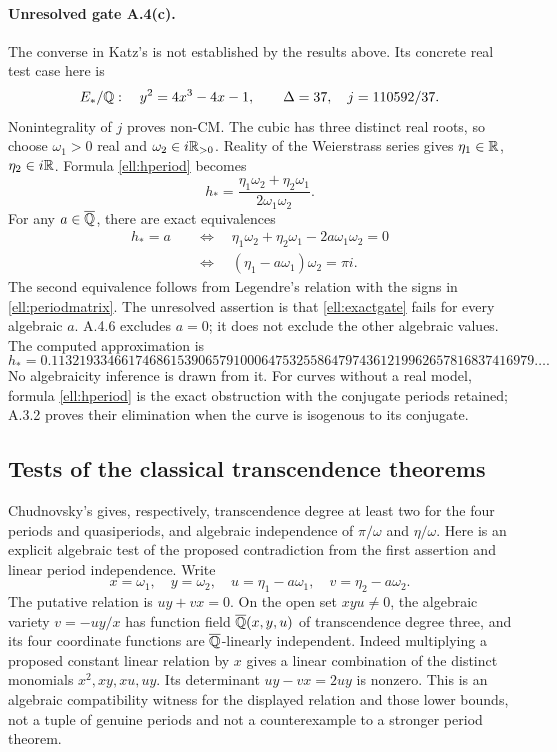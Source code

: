 \paragraph{Unresolved gate A.4(c).}
The converse in Katz's \cite[Question 4.0.8, p.501]{EllKatz1976} is not established by the results above. Its concrete real test case here is
\[
 E_* /\mathbb Q:\quad y^2=4x^3-4x-1,
 \qquad \Delta=37,\quad j=110592/37.
\]
Nonintegrality of $j$ proves non-CM. The cubic has three distinct real roots, so choose $\omega_1>0$ real and $\omega_2\in i\mathbb R_{>0}$. Reality of the Weierstrass series gives $\eta_1\in\mathbb R$, $\eta_2\in i\mathbb R$. Formula \eqref{ell:hperiod} becomes
\[
 h_* =\frac{\eta_1\omega_2+\eta_2\omega_1}{2\omega_1\omega_2}.
\]
For any $a\in\overline{\mathbb Q}$, there are exact equivalences
\begin{equation}\label{ell:exactgate}
 \begin{split}
 h_*=a
 &\quad\Longleftrightarrow\quad
 \eta_1\omega_2+\eta_2\omega_1-2a\omega_1\omega_2=0\\
 &\quad\Longleftrightarrow\quad (\eta_1-a\omega_1)\omega_2=\pi i.
 \end{split}
\end{equation}
The second equivalence follows from Legendre's relation with the signs in \eqref{ell:periodmatrix}. The unresolved assertion is that \eqref{ell:exactgate} fails for every algebraic $a$. A.4.6 excludes $a=0$; it does not exclude the other algebraic values. The computed approximation is
\[
 h_*=0.113219334661746861539065791000647532558647974361219962657816837416979\ldots.
\]
No algebraicity inference is drawn from it. For curves without a real model, formula \eqref{ell:hperiod} is the exact obstruction with the conjugate periods retained; A.3.2 proves their elimination when the curve is isogenous to its conjugate.

\subsection{Tests of the classical transcendence theorems}

Chudnovsky's \cite[\S2A, Theorems 1 and 3, p.343]{EllChudnovsky1978} gives, respectively, transcendence degree at least two for the four periods and quasiperiods, and algebraic independence of $\pi/\omega$ and $\eta/\omega$. Here is an explicit algebraic test of the proposed contradiction from the first assertion and linear period independence. Write
\[
 x=\omega_1,\quad y=\omega_2,\quad
 u=\eta_1-a\omega_1,\quad v=\eta_2-a\omega_2.
\]
The putative relation is $uy+vx=0$. On the open set $xyu\ne0$, the algebraic variety $v=-uy/x$ has function field $\overline{\mathbb Q}(x,y,u)$ of transcendence degree three, and its four coordinate functions are $\overline{\mathbb Q}$-linearly independent. Indeed multiplying a proposed constant linear relation by $x$ gives a linear combination of the distinct monomials $x^2,xy,xu,uy$. Its determinant $uy-vx=2uy$ is nonzero. This is an algebraic compatibility witness for the displayed relation and those lower bounds, not a tuple of genuine periods and not a counterexample to a stronger period theorem.

